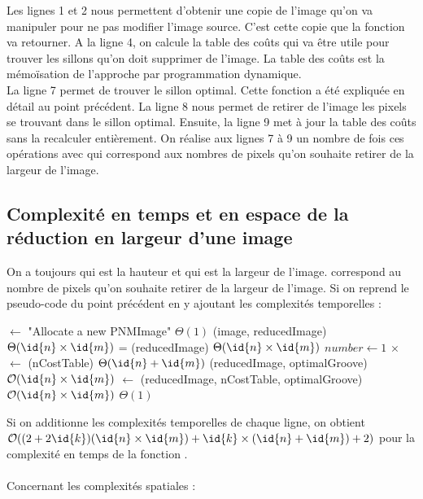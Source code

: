 \documentclass[a4paper, 11pt, oneside]{article}
\begin{document}
Les lignes 1 et 2 nous permettent d'obtenir une copie de l'image qu'on va manipuler pour ne pas modifier l'image source. C'est cette copie que la fonction va retourner.
A la ligne 4, on calcule la table des coûts qui va être utile pour trouver les sillons qu'on doit supprimer de l'image. La table des coûts est la mémoïsation de l'approche par programmation dynamique.\\
La ligne 7 permet de trouver le sillon optimal. Cette fonction a été expliquée en détail au point précédent. La ligne 8 nous permet de retirer de l'image les pixels se trouvant dans le sillon optimal. Ensuite, la ligne 9 met à jour la table des coûts sans la recalculer entièrement. On réalise aux lignes 7 à 9 un nombre  de fois ces opérations avec  qui correspond aux nombres de pixels qu'on souhaite retirer de la largeur de l'image.

\subsection{Complexité en temps et en espace de la réduction en largeur d'une image}
On a toujours  qui est la hauteur et  qui est la largeur de l'image.  correspond au nombre de pixels qu'on souhaite retirer de la largeur de l'image. Si on reprend le pseudo-code du point précédent en y ajoutant les complexités temporelles :
\begin{codebox} %
        \li {} $\gets$ "Allocate a new PNMImage" \Comment $\Theta(1)$
        \li {}(image, reducedImage) \Comment $\Theta(\id{n} \times \id{m})$
        \li {} = (reducedImage) \Comment $\Theta(\id{n} \times \id{m})$
        \li
	    \li \For $number \gets 1$ \To {} \Comment {} $\times$
                \Do
         \li    	{} $\gets$ (nCostTable) \Comment $\Theta(\id{n} + \id{m})$
         \li		{}(reducedImage, optimalGroove) \Comment $\mathcal{O}(\id{n} \times \id{m})$
         \li		{} $\gets$ (reducedImage, nCostTable, optimalGroove) \Comment $\mathcal{O}(\id{n} \times \id{m})$
                \End
        \li
        \li \Return {} \Comment $\Theta(1)$
\end{codebox}

Si on additionne les complexités temporelles de chaque ligne, on obtient $\mathcal{O}((2+2\id{k})(\id{n} \times \id{m}) + \id{k} \times (\id{n} + \id{m}) + 2)$ pour la complexité en temps de la fonction .\\
\\
\noindent Concernant les complexités spatiales :
\end{document}
